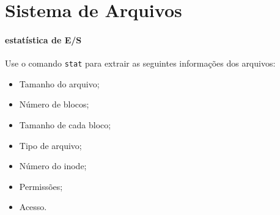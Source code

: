 
\section*{Sistema de Arquivos}

\paragraph{estatística de E/S} Use o comando {\tt stat} para extrair as seguintes
informações dos arquivos:\\

\begin{minipage}{.5\textwidth}
  \begin{itemize}
  \item Tamanho do arquivo;
  \item Número de blocos;
  \item Tamanho de cada bloco;
  \item Tipo de arquivo;
  \end{itemize}
\end{minipage}
\begin{minipage}{.5\textwidth}
  \begin{itemize}
  \item Número do inode;
  \item Permissões;
  \item Acesso.
  \end{itemize}
\end{minipage}
